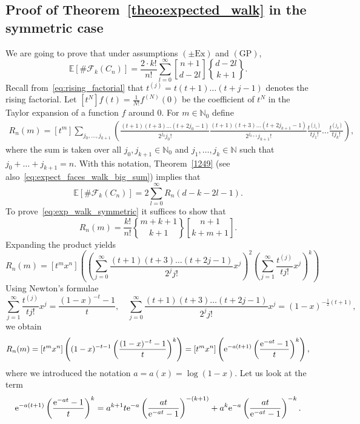 \documentclass[12pt, reqno]{amsart}
\theoremstyle{plain}
\theoremstyle{definition}
\theoremstyle{remark}
\begin{document}
\subsection{Proof of Theorem~\ref{theo:expected_walk} in the symmetric case}\label{subsec:simplification}
We are going to prove that under assumptions $(\pm\text{Ex})$ and $(\text{GP})$,
\begin{equation}\label{eq:exp_walk_symmetric}
{\mathbb E} [\# \mathcal F_k(C_n)]= \frac{2\cdot k!}{n!} \sum_{l=0}^{\infty}{\genfrac{[}{]}{0pt}{}{{n+1}}{{d-2l}}}  {\genfrac{\{}{\}}{0pt}{}{{d-2l}}{{k+1}}}.
\end{equation}
Recall from~\eqref{eq:rising_factorial} that $t^{(j)} = t(t+1)\ldots (t+j-1)$ denotes the rising factorial. Let $[t^N] f(t) = \frac 1 {N!} f^{(N)}(0)$ be the coefficient of $t^N$ in the Taylor expansion of a function $f$ around $0$. For $m\in{\mathbb{N}}_0$ define
\begin{multline*}
R_n(m)
= [t^m] \sum_{j_0,\ldots,j_{k+1}}
\left(\frac{(t+1)(t+3)\ldots (t+2j_0-1)}{2^{j_0} j_0!}
\frac{(t+1)(t+3)\ldots (t+2j_{k+1}-1)}{2^{j_{k+1}} j_{k+1}!}
\frac{t^{(j_1)}}{t j_1!}\ldots \frac{t^{(j_k)}}{t j_k!}\right),
\end{multline*}
where the sum  is taken over all $j_0, j_{k+1}\in{\mathbb{N}}_0$ and $j_1,\ldots,j_k\in{\mathbb{N}}$ such that $j_0+\ldots+j_{k+1} = n$.
With this notation,  Theorem~\ref{1249} (see also~\eqref{eq:expect_faces_walk_big_sum}) implies that
$$
{\mathbb E} [\# \mathcal F_k(C_n)]
=
2\sum_{l=0}^{\infty} R_n(d-k-2l-1).
$$
To prove~\eqref{eq:exp_walk_symmetric} it suffices to  show that
\begin{equation}\label{eq:R_n_m}
R_n(m) =\frac{k!}{n!} {\genfrac{\{}{\}}{0pt}{}{{m+k+1}}{{k+1}}} {\genfrac{[}{]}{0pt}{}{{n+1}}{{k+m+1}}}.
\end{equation}
Expanding the product yields
$$
R_n(m) = [t^mx^n] \left(\left(\sum_{j=0}^{\infty}\frac{(t+1)(t+3)\ldots (t+2j-1)}{2^{j} j!} x^j\right)^2 \left(\sum_{j=1}^\infty\frac{t^{(j)}}{t j!}x^j \right)^k \right)
$$
Using Newton's formulae
$$
\sum_{j=1}^\infty\frac{t^{(j)}}{t j!}x^j = \frac{(1-x)^{-t} - 1}{t},
\quad
\sum_{j=0}^{\infty}\frac{(t+1)(t+3)\ldots (t+2j-1)}{2^{j} j!} x^j = (1-x)^{-\frac 12 (t+1)},
$$
we obtain
$$
R_n(m)= [t^mx^n] \left((1-x)^{-t-1} \left(\frac{(1-x)^{-t} - 1}{t}\right)^k \right)
=[t^mx^n] \left({{\rm e}}^{-a(t+1)} \left(\frac{{{\rm e}}^{-at} - 1}{t}\right)^k \right),
$$
where we introduced the notation $a=a(x) = \log (1-x)$.
Let us look at the term
$$
{{\rm e}}^{-a(t+1)} \left(\frac{{{\rm e}}^{-at} - 1}{t}\right)^k
=
a^{k+1} t {{\rm e}}^{-a}  \left(\frac{at}{{{\rm e}}^{-at} - 1}\right)^{-(k+1)}
+ a^k {{\rm e}}^{-a}  \left(\frac{at}{{{\rm e}}^{-at} - 1}\right)^{-k}.
$$
\end{document}
